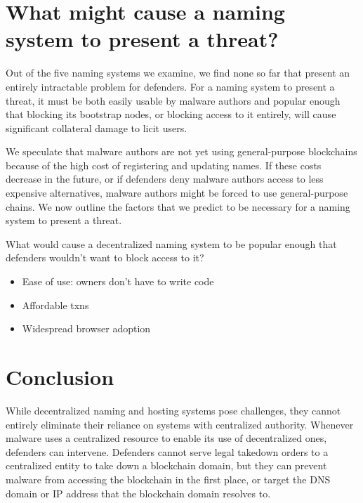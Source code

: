 \documentclass[10pt,sigconf,letterpaper]{acmart}
\begin{document}
\section{What might cause a naming system to present a threat?}

Out of the five naming systems we examine, we find none so far that present an 
entirely intractable problem for defenders. For a naming system to present a  
threat, it must be both easily usable by malware authors and 
popular enough that blocking its bootstrap nodes, or blocking 
access to it entirely, will cause significant collateral damage to licit users.

We speculate that malware authors are not yet using general-purpose 
blockchains 
because of the high cost of registering and updating names. If these costs 
decrease in the future, or if defenders deny malware authors access to less 
expensive alternatives, malware authors might be 
forced to use general-purpose chains. We now outline the factors that we 
predict to be necessary for a naming system to present a threat. 

What would cause a decentralized naming system to be popular enough that 
defenders wouldn't want to block access to it?
\begin{itemize}
	\item Ease of use: owners don't have to write code
	\item Affordable txns
	\item Widespread browser adoption
\end{itemize}

\section{Conclusion}

While decentralized naming and hosting systems pose challenges, they cannot 
entirely 
eliminate their reliance on systems with centralized authority. Whenever 
malware uses a centralized 
resource to enable its use of decentralized ones, defenders can intervene. 
Defenders cannot serve 
legal takedown orders to a centralized entity to take 
down a blockchain domain, but they can prevent malware from accessing the 
blockchain in the first 
place, or target the DNS domain or IP address that the blockchain domain 
resolves to.
\end{document}
